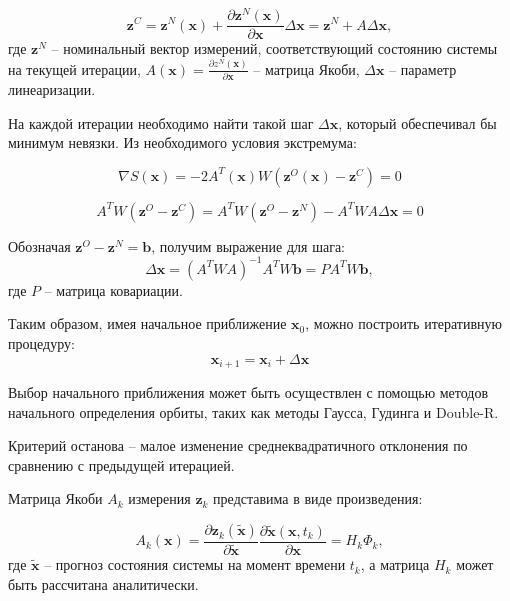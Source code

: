 \begin{equation*}
    \mathbf{z}^C = \mathbf{z}^N (\mathbf{x}) +  
    \frac{\partial \mathbf{z}^N (\mathbf{x})}{\partial \mathbf{x}} \Delta \mathbf{x} = 
    \mathbf{z}^N + A \Delta \mathbf{x},
\end{equation*}
где $\mathbf{z}^N$ -- номинальный вектор измерений, соответствующий состоянию системы на текущей итерации,
 $A (\mathbf{x}) = \frac{\partial z^N (\mathbf{x})}{\partial \mathbf{x}}$ -- матрица Якоби,
 $\Delta \mathbf{x}$ -- параметр линеаризации.

На каждой итерации необходимо найти такой шаг $\Delta \mathbf{x}$, который обеспечивал бы
минимум невязки. Из необходимого условия экстремума:

\begin{equation*}
    \nabla S(\mathbf{x}) = - 2 A^T (\mathbf{x}) W (\mathbf{z}^O (\mathbf{x}) - \mathbf{z}^C) = 0
\end{equation*}

\begin{equation*}
    A^T W (\mathbf{z}^O - \mathbf{z}^C) 
    = A^T W (\mathbf{z}^O - \mathbf{z}^N) - A^T W A \Delta \mathbf{x} = 0
\end{equation*}

Обозначая $\mathbf{z}^O - \mathbf{z}^N = \mathbf{b}$, получим выражение для шага:
\begin{equation}
    \Delta \mathbf{x} = (A^T W A)^{-1} A^T W \mathbf{b} = P A^T W \mathbf{b},
\end{equation}
где $P$ -- матрица ковариации.

Таким образом, имея начальное приближение $\mathbf{x}_{0}$, можно построить итеративную процедуру:
\begin{equation}
    \mathbf{x}_{i + 1} = \mathbf{x}_{i} + \Delta \mathbf{x}
\end{equation}

Выбор начального приближения может быть осуществлен с помощью методов начального
определения орбиты, таких как методы Гаусса, Гудинга и Double-R.

Критерий останова -- малое изменение среднеквадратичного отклонения по сравнению с предыдущей итерацией.

Матрица Якоби $A_k$ измерения $\mathbf{z}_k$ представима в виде произведения:

\begin{equation*}
    A_k(\mathbf{x}) = \frac{\partial \mathbf{z}_k (\mathbf{\tilde{x}})}{\partial \mathbf{\tilde{x}}}
    \frac{\partial \mathbf{\tilde{x}} (\mathbf{x}, t_k)}{\partial \mathbf{x}} = H_k \Phi_k,
\end{equation*}
где $\mathbf{\tilde{x}}$ -- прогноз состояния системы на момент времени $t_k$, 
а матрица $H_k$ может быть рассчитана аналитически.

